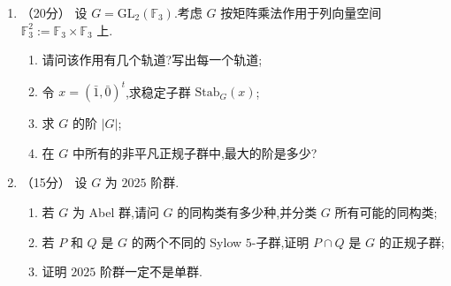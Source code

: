 \begin{enumerate}
\item （20分）
设 $G = \mathrm{GL}_{2}(\mathbb{F}_{3})$.考虑 $G$ 按矩阵乘法作用于列向量空间 $\mathbb{F}_{3}^{2} := \mathbb{F}_{3} \times \mathbb{F}_{3}$ 上.
\begin{enumerate}
    \item 请问该作用有几个轨道?写出每一个轨道;
    \item 令 $x = (\bar{1},\bar{0})^{t}$,求稳定子群 $\mathrm{Stab}_{G}(x)$;
    \item 求 $G$ 的阶 $|G|$;
    \item 在 $G$ 中所有的非平凡正规子群中,最大的阶是多少?
\end{enumerate}

\item （15分）
设 $G$ 为 $2025$ 阶群.
\begin{enumerate}
    \item 若 $G$ 为 Abel 群,请问 $G$ 的同构类有多少种,并分类 $G$ 所有可能的同构类;
    \item 若 $P$ 和 $Q$ 是 $G$ 的两个不同的 Sylow $5$-子群,证明 $P \cap Q$ 是 $G$ 的正规子群;
    \item 证明 $2025$ 阶群一定不是单群.
\end{enumerate}
\end{enumerate}


